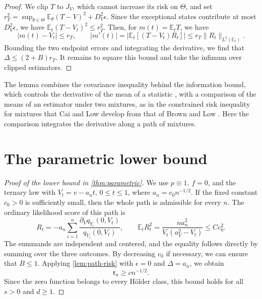 \begin{proof}
We clip $T$ to $J_V$, which cannot increase its risk on $\Theta$, and
set $r_T^2=\sup_{\theta\in\Theta}\mathbb E_\theta(T-V)^2+D_V^2\epsilon$.
Since the exceptional states contribute at most $D_V^2\epsilon$, we have
$\mathbb E_t(T-V_t)^2\le r_T^2$. Then, for $m(t)=\mathbb E_tT$, we have
\[
 |m(t)-V_t|\le r_T,\qquad
 |m'(t)|=|\mathbb E_t[(T-V_t)R_t]|
 \le r_T\|R_t\|_{L^2(\mathbb E_t)}.
\]
Bounding the two endpoint errors and integrating the derivative, we
find that $\Delta\le(2+B)r_T$. It remains to square this bound and take
the infimum over clipped estimators.
\end{proof}

The lemma combines the covariance inequality behind the information
bound, which controls the derivative of the mean of a statistic
\cite[Chapter~2, Theorem~5.10]{LehmannCasella1998}, with a comparison
of the means of an estimator under two mixtures, as in the constrained
risk inequality for mixtures that Cai and Low
\cite[Section~2, Theorem~2 and Corollary~1]{CaiLow2011} develop from
that of Brown and Low \cite{BrownLow1996}. Here the comparison integrates the derivative
along a path of mixtures.

\section{The parametric lower bound}\label{sec:prelim-parametric}

\begin{proof}[Proof of the lower bound in \cref{thm:parametric}]
We use $p\equiv1$, $f=0$, and the ternary law with
$V_t=v-a_nt$, $0\le t\le1$, where $a_n=c_0n^{-1/2}$.
If the fixed constant $c_0>0$ is sufficiently small, then the whole
path is admissible for every $n$. The ordinary likelihood score of this
path is
\[
 R_t=-a_n\sum_{i=1}^n
 \frac{\partial_Vq_{Y_i}(0,V_t)}{q_{Y_i}(0,V_t)},\qquad
 \mathbb E_tR_t^2=
 \frac{na_n^2}{V_t(a_Y^2-V_t)}\le Cc_0^2.
\]
The summands are independent and centered, and the equality follows
directly by summing over the three outcomes. By decreasing $c_0$ if
necessary, we can ensure that $B\le1$. Applying \cref{lem:path-risk}
with $\epsilon=0$ and $\Delta=a_n$, we obtain
\begin{equation}\label{eq:parametric-lower}
 \mathfrak r_n\ge cn^{-1/2}.
\end{equation}
Since the zero function belongs to every H\"older class, this bound
holds for all $s>0$ and $d\ge1$.
\end{proof}

